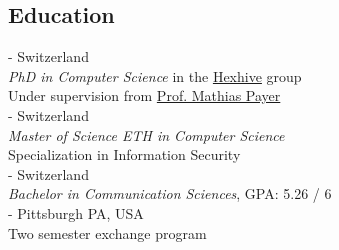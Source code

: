 \documentclass[mm, 11pt]{simple_style}
\begin{document}
\begin{resume}
\section{Education}
 - Switzerland  \\
{\sl PhD in Computer Science} in the \href{hexhive.epfl.ch}{Hexhive} group\\
Under supervision from \href{nebelwelt.net}{Prof. Mathias Payer}\\
 - Switzerland \\
{\sl Master of Science ETH in Computer Science}\\
Specialization in Information Security\\
 - Switzerland  \\
{\sl Bachelor in Communication Sciences}, GPA: 5.26 / 6\\
 - Pittsburgh PA, USA \\
Two semester exchange program\\
\sectionline

\end{resume}
\end{document}

